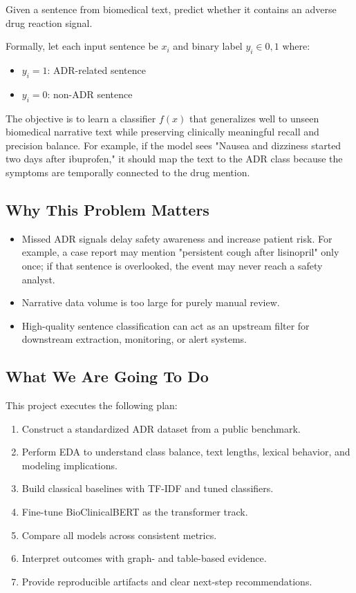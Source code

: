 \documentclass[11pt]{article}
\begin{document}
Given a sentence from biomedical text, predict whether it contains an adverse drug reaction signal.


Formally, let each input sentence be $x_i$ and binary label $y_i \in {0,1}$ where:


\begin{itemize}
  \item $y_i = 1$: ADR-related sentence
  \item $y_i = 0$: non-ADR sentence
\end{itemize}

The objective is to learn a classifier $f(x)$ that generalizes well to unseen biomedical narrative text while preserving clinically meaningful recall and precision balance. For example, if the model sees "Nausea and dizziness started two days after ibuprofen," it should map the text to the ADR class because the symptoms are temporally connected to the drug mention.


\subsection{Why This Problem Matters}


\begin{itemize}
  \item Missed ADR signals delay safety awareness and increase patient risk. For example, a case report may mention "persistent cough after lisinopril" only once; if that sentence is overlooked, the event may never reach a safety analyst.
  \item Narrative data volume is too large for purely manual review.
  \item High-quality sentence classification can act as an upstream filter for downstream extraction, monitoring, or alert systems.
\end{itemize}

\subsection{What We Are Going To Do}

This project executes the following plan:


\begin{enumerate}
  \item Construct a standardized ADR dataset from a public benchmark.
  \item Perform EDA to understand class balance, text lengths, lexical behavior, and modeling implications.
  \item Build classical baselines with TF-IDF and tuned classifiers.
  \item Fine-tune BioClinicalBERT as the transformer track.
  \item Compare all models across consistent metrics.
  \item Interpret outcomes with graph- and table-based evidence.
  \item Provide reproducible artifacts and clear next-step recommendations.
\end{enumerate}
\end{document}
